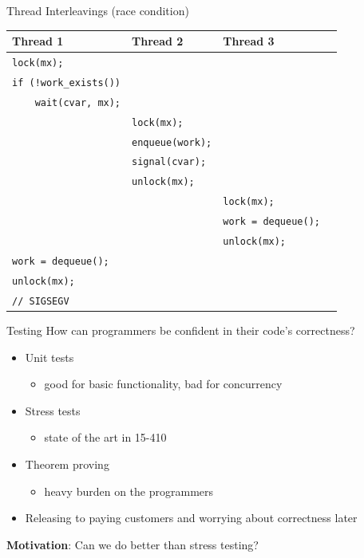 \documentclass[xcolor=dvipsnames]{beamer}
\begin{document}
\begin{frame}{Thread Interleavings (race condition)}
	\begin{center}
		\begin{tabular}{|l|l|l|}
			\hline
			\cellcolor{thread1} {\bf Thread 1} & \cellcolor{thread2} {\bf Thread 2} & \cellcolor{thread3} {\bf Thread 3} \\
			\hline
			\small \texttt{lock(mx);} & & \\
			\small \texttt{if~(!work\_exists())} & & \\
			\small \texttt{~~~~wait(cvar,~mx);} & & \\
			
			& \small \texttt{lock(mx);} & \\
			& \small \texttt{enqueue(work);} & \\
			& \small \texttt{signal(cvar);} & \\
			& \small \texttt{unlock(mx);} & \\
			
			& & \small \texttt{lock(mx);} \\
			& & \small \texttt{work~=~dequeue();~~} \\
			& & \small \texttt{unlock(mx);} \\

			\small \texttt{work~=~dequeue();} & & \\
			\small \texttt{unlock(mx);} & & \\
			\small \texttt{//~SIGSEGV} {\large \frownie}& & \\
			\hline
		\end{tabular}
	\end{center}
\end{frame}


\begin{frame}{Testing}
	How can programmers be confident in their code's correctness?
	\begin{itemize}
		\item Unit tests
		\begin{itemize}
			\item good for basic functionality, bad for concurrency
		\end{itemize}
		\item Stress tests
		\begin{itemize}
			\item state of the art in 15-410
		\end{itemize}
		\item Theorem proving
		\begin{itemize}
			\item heavy burden on the programmers
		\end{itemize}
		\item Releasing to paying customers and worrying about correctness later
	\end{itemize}
	\linegap

	{\bf Motivation}: Can we do better than stress testing?
\end{frame}
\end{document}
